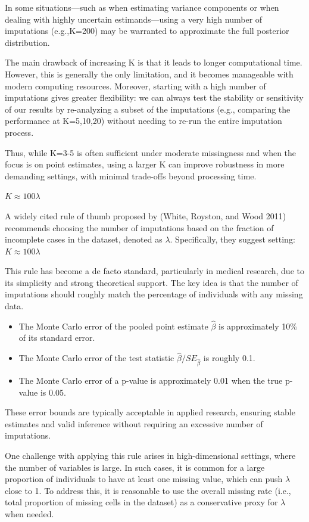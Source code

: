 \documentclass{article}
\begin{document}
In some situations---such as when estimating variance components or when
dealing with highly uncertain estimands---using a very high number of
imputations (e.g.,K=200) may be warranted to approximate the full
posterior distribution.

The main drawback of increasing K is that it leads to longer
computational time. However, this is generally the only limitation, and
it becomes manageable with modern computing resources. Moreover,
starting with a high number of imputations gives greater flexibility: we
can always test the stability or sensitivity of our results by
re-analyzing a subset of the imputations (e.g., comparing the
performance at K=5,10,20) without needing to re-run the entire
imputation process.

Thus, while K=3-5 is often sufficient under moderate missingness and
when the focus is on point estimates, using a larger K can improve
robustness in more demanding settings, with minimal trade-offs beyond
processing time.

\(K \approx 100\lambda\)

A widely cited rule of thumb proposed by (White, Royston, and Wood 2011)
recommends choosing the number of imputations based on the fraction of
incomplete cases in the dataset, denoted as \(\lambda\). Specifically,
they suggest setting:\(K \approx 100\lambda\)

This rule has become a de facto standard, particularly in medical
research, due to its simplicity and strong theoretical support. The key
idea is that the number of imputations should roughly match the
percentage of individuals with any missing data.

\begin{itemize}
\item
  The Monte Carlo error of the pooled point estimate \(\hat{\beta}\) is
  approximately 10\% of its standard error.
\item
  The Monte Carlo error of the test statistic
  \(\hat{\beta}/SE_{\hat{\beta}}\) is roughly 0.1.
\item
  The Monte Carlo error of a p-value is approximately 0.01 when the true
  p-value is 0.05.
\end{itemize}

These error bounds are typically acceptable in applied research,
ensuring stable estimates and valid inference without requiring an
excessive number of imputations.

One challenge with applying this rule arises in high-dimensional
settings, where the number of variables is large. In such cases, it is
common for a large proportion of individuals to have at least one
missing value, which can push \(\lambda\) close to 1. To address this,
it is reasonable to use the overall missing rate (i.e., total proportion
of missing cells in the dataset) as a conservative proxy for \(\lambda\)
when needed.
\end{document}
